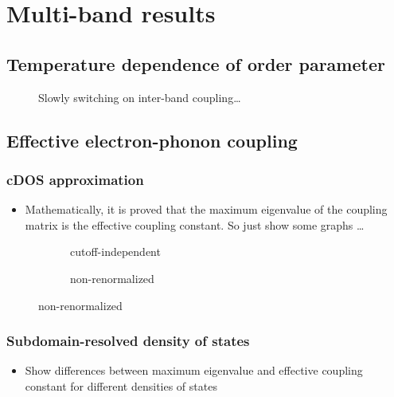 
\chapter{Multi-band results}

\section{Temperature dependence of order parameter}

\begin{figure}
   \small
   
   
   
   \caption{Slowly switching on inter-band coupling\dots \cite{NicolCarbotte05}}
\end{figure}

\section{Effective electron-phonon coupling}

\subsection{cDOS approximation}

\begin{itemize}
    \item Mathematically, it is proved that the maximum eigenvalue of the
          coupling matrix is the effective coupling constant. So just show some
          graphs \dots
\end{itemize}

\begin{figure}
   \small
   
   
   
   
   
   
\end{figure}

\begin{figure}
   \small
   
   
\end{figure}

\begin{figure}
   \small
   \begin{subfigure}{7cm}
      
      \caption{cutoff-independent}
   \end{subfigure}%
   \begin{subfigure}{7cm}
      
      \caption{non-renormalized}
   \end{subfigure}%
\end{figure}

\subsection{Subdomain-resolved density of states}

\begin{itemize}
    \item Show differences between maximum eigenvalue and effective coupling
          constant for different densities of states
\end{itemize}
